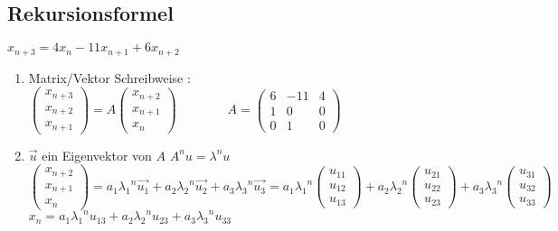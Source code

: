 	\subsection{Rekursionsformel}
		$x_{n+3} = 4x_n - 11x_{n+1} + 6x_{n+2}$\\
		\begin{enumerate}
			\item Matrix/Vektor Schreibweise : $\left(\begin{array}{c}
					x_{n+3}\\
					x_{n+2}\\
					x_{n+1}
				\end{array}\right) = A\left(\begin{array}{c}
					x_{n+2}\\
					x_{n+1}\\
					x_n
				\end{array}\right) \qquad \qquad A = \left(\begin{array}{ccc}
					6 & -11 & 4\\
					1 & 0 & 0\\
					0 & 1 & 0
				\end{array}\right)$

			\item $\vec{u}$ ein Eigenvektor von $A$ \qquad $A^nu = \lambda^nu$ \\
				$\left(\begin{array}{c}
					x_{n+2}\\
					x_{n+1}\\
					x_n
				\end{array}\right) = 
				a_1{\lambda_1}^n\vec{u_1}+a_2{\lambda_2}^n\vec{u_2}+ a_3{\lambda_3}^n\vec{u_3} =
				a_1{\lambda_1}^n\left(\begin{array}{c}
					u_{11}\\
					u_{12}\\
					u_{13}
				\end{array}\right) + a_2{\lambda_2}^n\left(\begin{array}{c}
					u_{21}\\
					u_{22}\\
					u_{23}
				\end{array}\right) + a_3{\lambda_3}^n\left(\begin{array}{c}
					u_{31}\\
					u_{32}\\
					u_{33}
				\end{array}\right)$ \\
				$x_n = a_1{\lambda_1}^nu_{13} + a_2{\lambda_2}^nu_{23} + a_3{\lambda_3}^nu_{33}$
		\end{enumerate}
